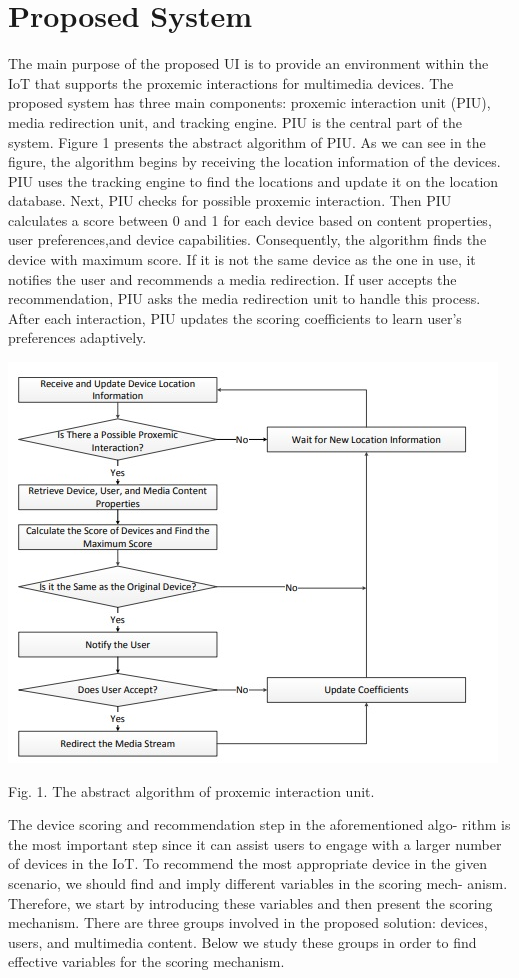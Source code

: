 \documentclass[runningheads,a4paper]{llncs}
\begin{document}
\section{Proposed System}
The main purpose of the proposed UI is to provide an environment within the
IoT that supports the proxemic interactions for multimedia devices. The proposed system has three main components: proxemic interaction unit (PIU), media redirection unit, and tracking engine. PIU is the central part of the system.
Figure 1 presents the abstract algorithm of PIU. As we can see in the figure, the
algorithm begins by receiving the location information of the devices. PIU uses
the tracking engine to find the locations and update it on the location database.
Next, PIU checks for possible proxemic interaction. Then PIU calculates a score
between 0 and 1 for each device based on content properties, user preferences,and device capabilities. Consequently, the algorithm finds the device with maximum score. If it is not the same device as the one in use, it notifies the user and
recommends a media redirection. If user accepts the recommendation, PIU asks
the media redirection unit to handle this process. After each interaction, PIU
updates the scoring coefficients to learn user’s preferences adaptively.


\includegraphics{fig1.jpg}

Fig. 1. The abstract algorithm of proxemic interaction unit.


The device scoring and recommendation step in the aforementioned algo-
rithm is the most important step since it can assist users to engage with a larger
number of devices in the IoT. To recommend the most appropriate device in the
given scenario, we should find and imply different variables in the scoring mech-
anism. Therefore, we start by introducing these variables and then present the
scoring mechanism. There are three groups involved in the proposed solution:
devices, users, and multimedia content. Below we study these groups in order to
find effective variables for the scoring mechanism.
\end{document}

